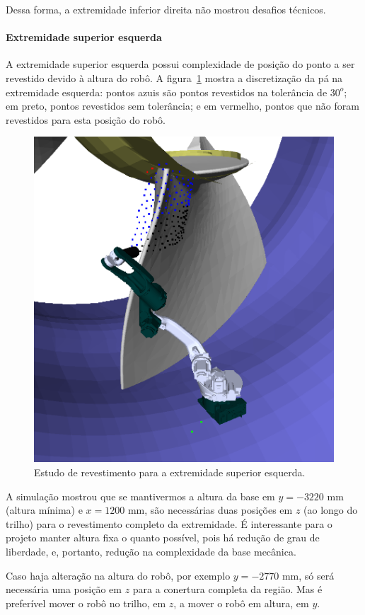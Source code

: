Dessa forma, a extremidade inferior direita não mostrou desafios técnicos.

\paragraph{Extremidade superior esquerda}\label{superioresquerda}

A extremidade superior esquerda possui complexidade de posição do ponto a
ser revestido devido à altura do robô. A figura~\ref{fig::shoulderleft} mostra
a discretização da pá na extremidade esquerda: pontos azuis são pontos revestidos na tolerância de
$30^o$; em preto, pontos revestidos sem tolerância; e em vermelho, pontos que
não foram revestidos para esta posição do robô.

\begin{figure}[!ht]
	\centering	
	\includegraphics[width=0.7\columnwidth]{method/figs/shoulderleft.png}
	\caption{Estudo de revestimento para a extremidade superior esquerda.}
	\label{fig::shoulderleft}
\end{figure}

A simulação mostrou que se mantivermos a altura da base em $y=-3220$ mm
(altura mínima) e $x=1200$ mm, são necessárias duas posições em $z$ (ao longo do
trilho) para o revestimento completo da extremidade. É interessante para o
projeto manter altura fixa o quanto possível, pois há redução de grau de
liberdade, e, portanto, redução na complexidade da base mecânica.

Caso haja alteração na altura do robô, por exemplo  $y=-2770$ mm, só será
necessária uma posição em $z$ para a conertura completa da região. Mas é
preferível mover o robô no trilho, em $z$, a mover o robô em altura, em $y$. 

